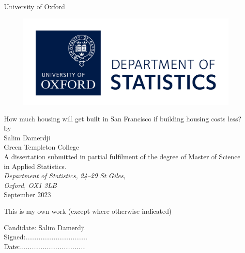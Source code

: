 \documentclass[a4paper,12pt]{article}
\author{Salim Damerdji}
\date{August 2023}
\begin{document}
\begin{titlepage}
\begin{center}
\vspace{1cm}
\textsf{\Huge{University of Oxford \\}}
\vspace{1cm}
\begin{figure}[htb]
\centering
\includegraphics[scale=.8]{figures/stats_logo.jpg}
\end{figure}
\vspace{2.0cm}
\Huge{How much housing will get built in San Francisco if building housing costs less?\\}
\vspace{2.0cm}
\large{ by \\[14pt] Salim Damerdji \\[8pt] Green Templeton College} \\
\vspace{2.2cm}
\large{A dissertation submitted in partial fulfilment of the degree of Master of
Science in Applied Statistics.
} \\
\vspace{.5cm}
\large{\emph{Department of Statistics, 24--29 St Giles, \\Oxford, OX1 3LB}} \\
\vspace{1.0cm}
\large{September 2023} \\
\end{center}
\end{titlepage}
\clearpage
This is my own work (except where otherwise indicated)
\vspace{2.5in}
\begin{center}
Candidate: Salim Damerdji\\
\vspace{1.0in}
Signed:.................................\\
\vspace{1.0in}
Date:...................................
\end{center}
\end{document}
